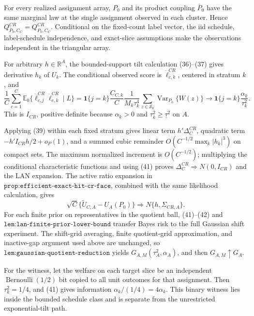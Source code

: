 For every realized assignment array, \(P_0\) and its product coupling \(\bar P_0\) have the same marginal law at the single assignment observed in each cluster.  Hence \(Q^{CR}_{\bar P_0,C_C}=Q^{CR}_{P_0,C_C}\).  Conditional on the fixed-count label vector, the iid schedule, label-schedule independence, and exact-slice assumptions make the observations independent in the triangular array.

For arbitrary \(h\in\mathbb R^A\), the bounded-support tilt calculation (36)--(37) gives derivative \(h_k\) of \(U_k\).  The conditional observed score is \(\dot\ell_{c,k}^{CR}\), centered in stratum \(k\), and
\[
 \frac1C\sum_{c=1}^C\mathbb E_0\{\dot\ell_{c,j}^{CR}\dot\ell_{c,k}^{CR}\mid L\}
 =\mathbf1\{j=k\}\frac{C_{C,k}}C\frac1{M_k\tau_k^4}
 \sum_{z\in\mathcal S_k}\operatorname{Var}_{P_0}\{W(z)\}
 \longrightarrow\mathbf1\{j=k\}\frac{\alpha_k}{\tau_k^2}. \tag{41}
\]
This is \(I_{CR}\), positive definite because \(\alpha_k>0\) and \(\tau_k^2\geq\underline\tau^2\) on \(A\).

Applying (39) within each fixed stratum gives linear term \(h'\Delta_C^{CR}\), quadratic term \(-h'I_{CR}h/2+o_P(1)\), and a summed cubic remainder \(O(C^{-1/2}\max_k|h_k|^3)\) on compact sets.  The maximum normalized increment is \(O(C^{-1/2})\); multiplying the conditional characteristic functions and using (41) proves \(\Delta_C^{CR}\Rightarrow N(0,I_{CR})\) and the LAN expansion.  The active ratio expansion in \(\texttt{prop:efficient-exact-hit-cr-face}\), combined with the same likelihood calculation, gives
\[
 \sqrt C\{\widetilde U_{C,A}-U_A(P_0)\}\Rightarrow N\{h,\Sigma_{CR,A}\}. \tag{42}
\]
For each finite prior on representatives in the quotient ball, (41)--(42) and \(\texttt{lem:lan-finite-prior-lower-bound}\) transfer Bayes risk to the full Gaussian shift experiment.  The shift-grid averaging, finite quotient-grid approximation, and inactive-gap argument used above are unchanged, so \(\texttt{lem:gaussian-quotient-reduction}\) yields \(G_{A,M}(\tau_A^2,\alpha_A)\), and then \(G_{A,M}\uparrow G_A\).

For the witness, let the welfare on each target slice be an independent \(\operatorname{Bernoulli}(1/2)\) bit copied to all unit outcomes for that assignment.  Then \(\tau_k^2=1/4\), and (41) gives information \(\alpha_k/(1/4)=4\alpha_k\).  This binary witness lies inside the bounded schedule class and is separate from the unrestricted exponential-tilt path.